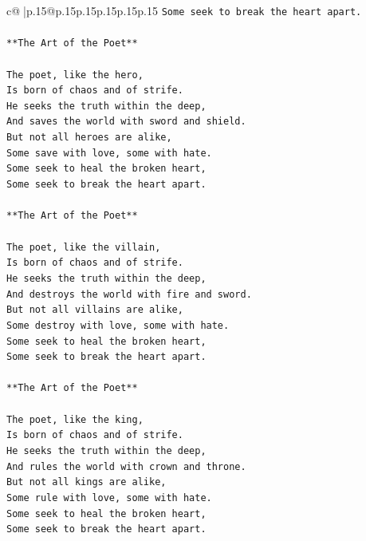 \documentclass{article}
\begin{document}
{\begin{supertabular}{c@{$\;$}|p{.15\linewidth}@{}p{.15\linewidth}p{.15\linewidth}p{.15\linewidth}p{.15\linewidth}p{.15\linewidth}}
{{{\texttt{Some seek to break the heart apart.} \\
\\ 
\texttt{**The Art of the Poet**} \\
\\ 
\texttt{The poet, like the hero,} \\
\texttt{Is born of chaos and of strife.} \\
\texttt{He seeks the truth within the deep,} \\
\texttt{And saves the world with sword and shield.} \\
\texttt{But not all heroes are alike,} \\
\texttt{Some save with love, some with hate.} \\
\texttt{Some seek to heal the broken heart,} \\
\texttt{Some seek to break the heart apart.} \\
\\ 
\texttt{**The Art of the Poet**} \\
\\ 
\texttt{The poet, like the villain,} \\
\texttt{Is born of chaos and of strife.} \\
\texttt{He seeks the truth within the deep,} \\
\texttt{And destroys the world with fire and sword.} \\
\texttt{But not all villains are alike,} \\
\texttt{Some destroy with love, some with hate.} \\
\texttt{Some seek to heal the broken heart,} \\
\texttt{Some seek to break the heart apart.} \\
\\ 
\texttt{**The Art of the Poet**} \\
\\ 
\texttt{The poet, like the king,} \\
\texttt{Is born of chaos and of strife.} \\
\texttt{He seeks the truth within the deep,} \\
\texttt{And rules the world with crown and throne.} \\
\texttt{But not all kings are alike,} \\
\texttt{Some rule with love, some with hate.} \\
\texttt{Some seek to heal the broken heart,} \\
\texttt{Some seek to break the heart apart.} \\
}}}
\end{supertabular}}
\end{document}
